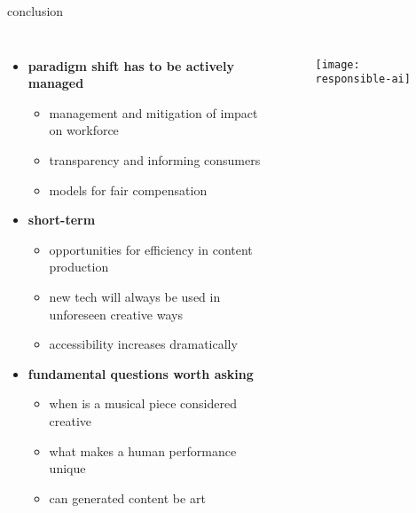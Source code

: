 \begin{frame}{conclusion}{}
    \vspace{-5mm}
    \begin{columns}
        \begin{itemize}
            \item   \textbf{paradigm shift has to be actively managed}
                \begin{itemize}
                    \item management and mitigation of impact on workforce
                    \item transparency and informing consumers
                    \item models for fair compensation
                \end{itemize}
            \smallskip
            \item   \textbf{short-term}
                \begin{itemize}
                    \item opportunities for efficiency in content production
                    \item new tech will always be used in unforeseen creative ways
                    \item accessibility increases dramatically
                \end{itemize}
            \smallskip
            \item   \textbf{fundamental questions worth asking}
                \begin{itemize}
                    \item when is a musical piece considered creative
                    \item what makes a human performance unique
                    \item can generated content be art
                \end{itemize}
        \end{itemize}
        \vspace{20mm}
        \begin{figure}%
            \texttt{[image: responsible-ai]}%
        \end{figure}
    \end{columns}
\end{frame}